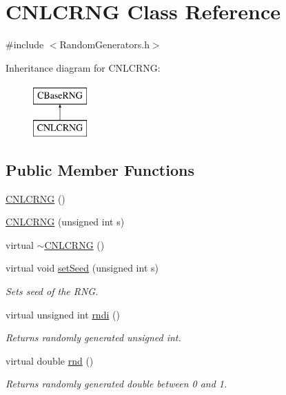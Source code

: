 \hypertarget{class_c_n_l_c_r_n_g}{\section{C\-N\-L\-C\-R\-N\-G Class Reference}
\label{class_c_n_l_c_r_n_g}
}


{\ttfamily \#include $<$Random\-Generators.\-h$>$}

Inheritance diagram for C\-N\-L\-C\-R\-N\-G\-:\begin{figure}[H]
\begin{center}
\leavevmode
\includegraphics[height=2.000000cm]{class_c_n_l_c_r_n_g}
\end{center}
\end{figure}
\subsection*{Public Member Functions}
\begin{DoxyCompactItemize}
\item 
\hyperlink{class_c_n_l_c_r_n_g_a5d7202006a1e561b71687aa8088fe03f}{C\-N\-L\-C\-R\-N\-G} ()
\item 
\hyperlink{class_c_n_l_c_r_n_g_a9fbafb2eaa13d24b080890e50300dad3}{C\-N\-L\-C\-R\-N\-G} (unsigned int s)
\item 
virtual \hyperlink{class_c_n_l_c_r_n_g_a2631905fcd81aaa129a568dc569100a4}{$\sim$\-C\-N\-L\-C\-R\-N\-G} ()
\item 
virtual void \hyperlink{class_c_n_l_c_r_n_g_a9f6321c4d53774b0c017c6e18124d495}{set\-Seed} (unsigned int s)
\begin{DoxyCompactList}\small\item\em Sets seed of the R\-N\-G. \end{DoxyCompactList}\item 
virtual unsigned int \hyperlink{class_c_n_l_c_r_n_g_a531b9ca98fc7934c90759c1733618298}{rndi} ()
\begin{DoxyCompactList}\small\item\em Returns randomly generated unsigned int. \end{DoxyCompactList}\item 
virtual double \hyperlink{class_c_n_l_c_r_n_g_a5f4f420ffb9147d9edb25b4d49ac05a5}{rnd} ()
\begin{DoxyCompactList}\small\item\em Returns randomly generated double between 0 and 1. \end{DoxyCompactList}\end{DoxyCompactItemize}
